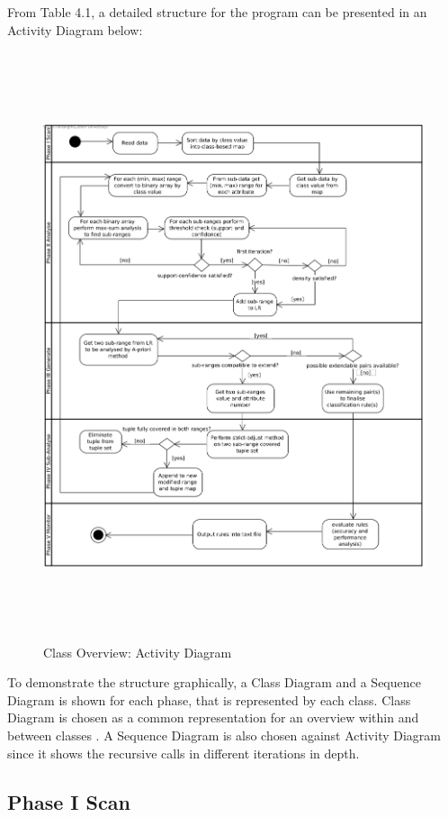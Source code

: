 From Table 4.1, a detailed structure for the program can be presented in an Activity Diagram below:
\begin{figure}[h]
    \centering
    \includegraphics[width=6.5in, height=6.8in]{figures/activity_overview}
    \caption[Class Overview: Activity Diagram]{Class Overview: Activity Diagram}
    \label{fig:figure4_1}
\end{figure}


 To demonstrate the structure graphically, a Class Diagram and a Sequence Diagram is shown for each phase, that is represented by each class. Class Diagram is chosen as a common representation for an overview within and between classes \cite{seclass}. A Sequence Diagram is also chosen against Activity Diagram since it shows the recursive calls in different iterations in depth.

\subsection{Phase I Scan}

